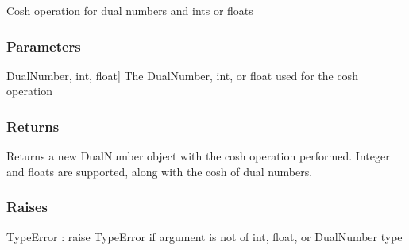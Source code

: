 \documentclass[letterpaper,10pt,english]{sphinxmanual}
\begin{document}
\begin{fulllineitems}
\label{\detokenize{autodiff:autodiff.operators.cosh}}
\pysigstartsignatures
{}
\pysigstopsignatures
\sphinxAtStartPar
Cosh operation for dual numbers and ints or floats


\subsubsection{Parameters}
\label{\detokenize{autodiff:id18}}\begin{description}
\sphinxlineitem{x}{[}DualNumber, int, float{]}
\sphinxAtStartPar
The DualNumber, int, or float used for the cosh operation

\end{description}


\subsubsection{Returns}
\label{\detokenize{autodiff:id19}}\begin{description}
\sphinxAtStartPar
Returns a new DualNumber object with the cosh operation performed. Integer and
floats are supported, along with the cosh of dual numbers.

\end{description}


\subsubsection{Raises}
\label{\detokenize{autodiff:id20}}
\sphinxAtStartPar
TypeError : raise TypeError if argument is not of int, float, or DualNumber type

\end{fulllineitems}

\end{document}
